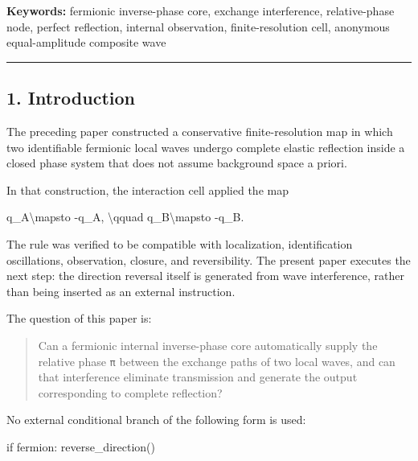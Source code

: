 \documentclass[
  a4paper,
]{article}
\newenvironment{Shaded}{}{}
\newcommand{\NormalTok}[1]{#1}
\begin{document}
\textbf{Keywords:} fermionic inverse-phase core, exchange interference,
relative-phase node, perfect reflection, internal observation,
finite-resolution cell, anonymous equal-amplitude composite wave

\begin{center}\rule{0.5\linewidth}{0.5pt}\end{center}

\subsection{1. Introduction}\label{introduction}

The preceding paper constructed a conservative finite-resolution map in
which two identifiable fermionic local waves undergo complete elastic
reflection inside a closed phase system that does not assume background
space a priori.

In that construction, the interaction cell applied the map

\begin{Shaded}
\begin{Highlighting}[]
\NormalTok{q\_A\textbackslash{}mapsto {-}q\_A,}
\NormalTok{\textbackslash{}qquad}
\NormalTok{q\_B\textbackslash{}mapsto {-}q\_B.}
\end{Highlighting}
\end{Shaded}

The rule was verified to be compatible with localization, identification
oscillations, observation, closure, and reversibility. The present paper
executes the next step: the direction reversal itself is generated from
wave interference, rather than being inserted as an external
instruction.

The question of this paper is:

\begin{quote}
Can a fermionic internal inverse-phase core automatically supply the
relative phase \texttt{π} between the exchange paths of two local waves,
and can that interference eliminate transmission and generate the output
corresponding to complete reflection?
\end{quote}

No external conditional branch of the following form is used:

\begin{Shaded}
\begin{Highlighting}[]
\NormalTok{if fermion:}
\NormalTok{    reverse\_direction()}
\end{Highlighting}
\end{Shaded}
\end{document}
